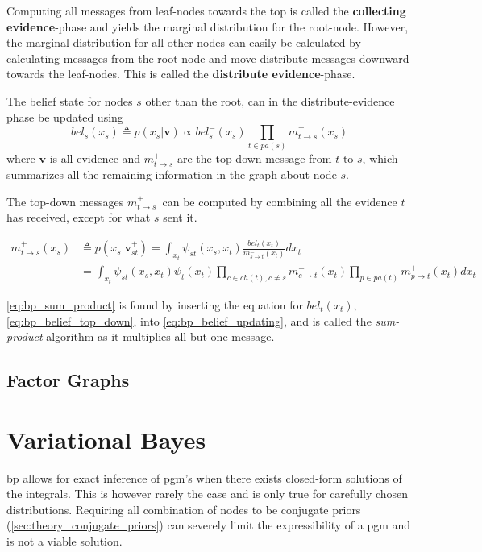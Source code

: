 Computing all messages from leaf-nodes towards the top is called the \textbf{collecting evidence}-phase and yields the marginal distribution for the root-node. However, the marginal distribution for all other nodes can easily be calculated by calculating messages from the root-node and move distribute messages downward towards the leaf-nodes. This is called the \textbf{distribute evidence}-phase. 

The belief state for nodes $s$ other than the root, can in the distribute-evidence phase be updated using
\begin{equation}\label{eq:bp_belief_top_down}
    bel_s(x_s) \triangleq p(x_s | \mathbf{v}) \propto bel_s^-(x_s) \prod_{t \in pa(s)} m_{t \to s}^+(x_s)
\end{equation}
where $\mathbf{v}$ is all evidence and $m_{t \to s}^+$ are the top-down message from $t$ to $s$, which summarizes all the remaining information in the graph about node $s$. 

The top-down messages $m_{t \to s}^+$ can be computed by combining all the evidence $t$ has received, except for what $s$ sent it.

\begin{subequations}
\begin{align}
    m_{t \to s}^+(x_s) &\triangleq p(x_s | \mathbf{v}_{st}^+) = \int_{x_t}\psi_{st}(x_s, x_t)\frac{bel_t(x_t)}{m_{s \to t}^-(x_t)}dx_t \label{eq:bp_belief_updating}\\
    &= \int_{x_t} \psi_{st}(x_s, x_t)\psi_t(x_t) \prod_{c \in ch(t), c \neq s} m_{c \to t}^-(x_t) \prod_{p \in pa(t)} m_{p \to t}^+(x_t)dx_t\label{eq:bp_sum_product}
\end{align}
\end{subequations}

\cref{eq:bp_sum_product} is found by inserting the equation for $bel_t(x_t)$, \cref{eq:bp_belief_top_down}, into \cref{eq:bp_belief_updating}, and is called the \textit{sum-product} algorithm as it multiplies all-but-one message. 







\subsection{Factor Graphs}
\section{Variational Bayes}
\acrshort{bp} allows for exact inference of \acrshort{pgm}'s when there exists closed-form solutions of the integrals. This is however rarely the case and is only true for carefully chosen distributions. Requiring all combination of nodes to be conjugate priors (\cref{sec:theory_conjugate_priors}) can severely limit the expressibility of a \acrshort{pgm} and is not a viable solution. 

